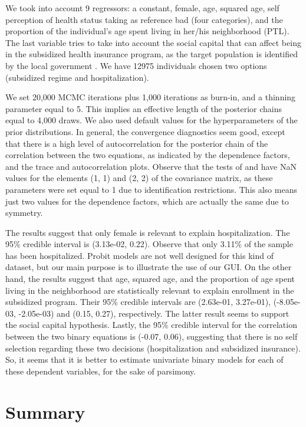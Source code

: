 We took into account 9 regressors: a constant, female, age, squared age, self perception of health status taking as reference bad (four categories), and the proportion of the individual's age spent living in her/his neighborhood (PTL). 
The last variable tries to take into account the social capital that can affect being in the subsidized health insurance program, as the target population is identified by the local government \cite{Ramirez2019a}. We have 12975 individuals chosen two options (subsidized regime and hospitalization).

We set 20,000 MCMC iterations plus 1,000 iterations as burn-in, and a thinning parameter equal to 5.
This implies an effective length of the posterior chains equal to 4,000 draws.
We also used default values for the hyperparameters of the prior distributions.
In general, the convergence diagnostics seem good, except that there is a high level of autocorrelation for the posterior chain of the correlation between the two equations, as indicated by the dependence factors, and the trace and autocorrelation plots.
Observe that the tests of \cite{Geweke1992} and \cite{Heidelberger1983} have NaN values for the elements (1, 1) and (2, 2) of the covariance matrix, as these parameters were set equal to 1 due to identification restrictions.
This also means just two values for the dependence factors, which are actually the same due to symmetry.

The results suggest that only female is relevant to explain hospitalization.
The 95\% credible interval is (3.13e-02, 0.22).
Observe that only 3.11\% of the sample has been hospitalized.
Probit models are not well designed for this kind of dataset, but our main purpose is to illustrate the use of our GUI.
On the other hand, the results suggest that age, squared age, and the proportion of age spent living in the neighborhood are statistically relevant to explain enrollment in the subsidized program.
Their 95\% credible intervals are (2.63e-01, 3.27e-01), (-8.05e-03, -2.05e-03) and (0.15, 0.27), respectively.
The latter result seems to support the social capital hypothesis.
Lastly, the 95\% credible interval for the correlation between the two binary equations is (-0.07, 0.06), suggesting that there is no self selection regarding these two decisions (hospitalization and subsidized insurance).
So, it seems that it is better to estimate univariate binary models for each of these dependent variables, for the sake of parsimony.



\section{Summary}\label{sec75}

